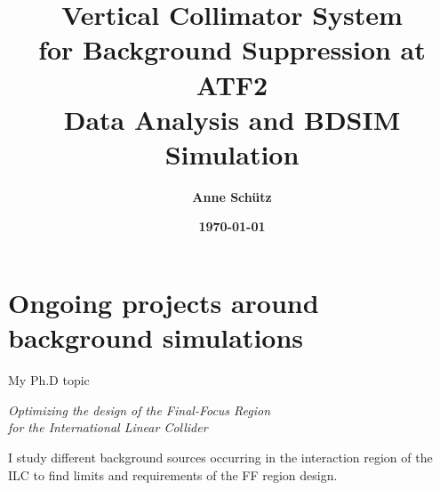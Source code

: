 \documentclass[xcolor={dvipsnames}]{beamer}
\title[ATF2 Background Simulations]{\textbf{Vertical Collimator System\\for Background Suppression at ATF2\\\small{Data Analysis and BDSIM Simulation}}}
\author{\textbf{Anne Sch\"utz}}
\institute{\textbf{KIT, DESY}}
\date{\textbf{\today}}
\begin{document}
{
\begin{frame}
  \titlepage
\end{frame}
}



\section{Ongoing projects around background simulations}
\begin{frame}{My Ph.D topic}
 \begin{block}{}
  \centering
  \textit{Optimizing the design of the Final-Focus Region\\for the International Linear Collider}
  \end{block}
  \vspace*{0.5cm}
  I study different background sources occurring in the interaction region of the ILC to find limits and requirements of the FF region design.
\end{frame}


\end{document}
